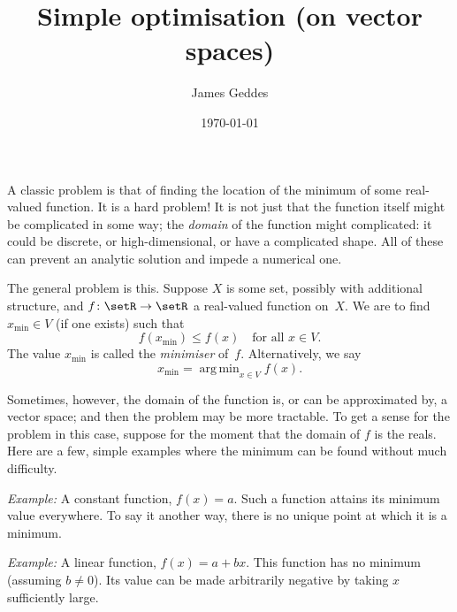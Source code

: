 \documentclass[10pt, a4paper]{article}
\title{Simple optimisation (on vector spaces)}
\author{James Geddes}
\date{\today}
\DeclareMathOperator*{\argmin}{arg\,min}
\newcommand{\eg}{\emph{Example:}}
\begin{document}
\maketitle

A classic problem is that of finding the location of the minimum of
some real-valued function. It is a hard problem! It is not just that
the function itself might be complicated in some way; the
\emph{domain} of the function might complicated: it could be discrete,
or high-dimensional, or have a complicated shape. All of these can
prevent an analytic solution and impede a numerical one.

The general problem is this. Suppose $X$ is some set, possibly with
additional structure, and $f\colon \setR \to \setR$ a real-valued function
on~$X$. We are to find $x_\text{min}\in V$ (if one exists) such that
\[
 f(x_\text{min}) \leq f(x) \quad\text{for all $x\in V$}.  
\]
The value $x_\text{min}$ is called the \emph{minimiser}
of~$f$. Alternatively, we say
\begin{equation}
  x_\text{min} = \argmin_{x\in V} f(x).
\label{eq:argmin}
\end{equation}

Sometimes, however, the domain of the function is, or can be
approximated by, a vector space; and then the problem may be more
tractable. To get a sense for the problem in this case, suppose for
the moment that the domain of $f$ is the reals. Here are a few, simple
examples where the minimum can be found without much difficulty.

\eg{} A constant function, $f(x) = a$. Such a function attains its
minimum value everywhere. To say it another way, there is no unique
point at which it is a minimum.

\eg{} A linear function, $f(x) = a + bx$. This
function has no minimum (assuming $b\neq0$). Its value can be made
arbitrarily negative by taking $x$ sufficiently large.
\end{document}
